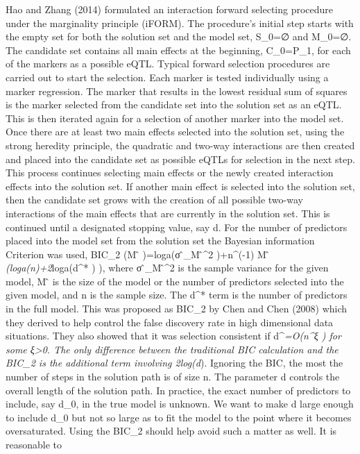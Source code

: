 \documentclass[]{book}
\theoremstyle{definition}
\theoremstyle{definition}
\theoremstyle{remark}
\begin{document}
Hao and Zhang (2014) formulated an interaction forward selecting
procedure under the marginality principle (iFORM). The procedure's
initial step starts with the empty set for both the solution set and the
model set, S\_0=∅ and M\_0=∅. The candidate set contains all main
effects at the beginning, C\_0=P\_1, for each of the markers as a
possible eQTL. Typical forward selection procedures are carried out to
start the selection. Each marker is tested individually using a marker
regression. The marker that results in the lowest residual sum of
squares is the marker selected from the candidate set into the solution
set as an eQTL. This is then iterated again for a selection of another
marker into the model set. Once there are at least two main effects
selected into the solution set, using the strong heredity principle, the
quadratic and two-way interactions are then created and placed into the
candidate set as possible eQTLs for selection in the next step. This
process continues selecting main effects or the newly created
interaction effects into the solution set. If another main effect is
selected into the solution set, then the candidate set grows with the
creation of all possible two-way interactions of the main effects that
are currently in the solution set. This is continued until a designated
stopping value, say d. For the number of predictors placed into the
model set from the solution set the Bayesian information Criterion was
used, BIC\_2 (M ̂ )=loga(σ ̂\_M ̂\^{}2 )+n\^{}(-1) \textbar{}M ̂
\textbar{}\emph{(loga(n)+2}loga(d\^{}* ) ), where σ ̂\_M ̂\^{}2 is the
sample variance for the given model, \textbar{}M ̂ \textbar{} is the size
of the model or the number of predictors selected into the given model,
and n is the sample size. The d\^{}* term is the number of predictors in
the full model. This was proposed as BIC\_2 by Chen and Chen (2008)
which they derived to help control the false discovery rate in high
dimensional data situations. They also showed that it was selection
consistent if d\^{}\emph{=O(n\^{}ξ ) for some ξ\textgreater{}0. The only
difference between the traditional BIC calculation and the BIC\_2 is the
additional term involving 2log(d}). Ignoring the BIC, the most the
number of steps in the solution path is of size n. The parameter d
controls the overall length of the solution path. In practice, the exact
number of predictors to include, say d\_0, in the true model is unknown.
We want to make d large enough to include d\_0 but not so large as to
fit the model to the point where it becomes oversaturated. Using the
BIC\_2 should help avoid such a matter as well. It is reasonable to
\end{document}
